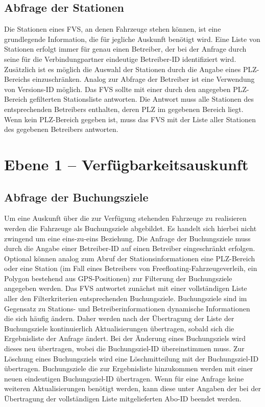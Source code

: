 \subsection{Abfrage der Stationen}
Die Stationen eines FVS, an denen Fahrzeuge stehen können, ist eine grundlegende Information, die für jegliche Auskunft benötigt wird. Eine Liste von Stationen erfolgt immer für genau einen Betreiber, der bei der Anfrage durch seine für die Verbindungpartner eindeutige Betreiber-ID identifiziert wird. Zusätzlich ist es möglich die Auswahl der Stationen durch die Angabe eines PLZ-Bereichs einzuschränken. Analog zur Abfrage der Betreiber ist eine Verwendung von Versions-ID möglich. Das FVS  sollte mit einer durch den angegeben PLZ-Bereich gefilterten Stationsliste antworten. Die Antwort muss alle Stationen des entsprechenden Betreibers enthalten, deren PLZ im gegebenen Bereich liegt. Wenn kein PLZ-Bereich gegeben ist, muss das FVS mit der Liste aller Stationen des gegebenen Betreibers antworten.

\section{Ebene 1 -- Verfügbarkeitsauskunft}

\subsection{Abfrage der Buchungsziele}
 Um eine Auskunft über die zur Verfügung stehenden Fahrzeuge zu realisieren werden die Fahrzeuge als Buchungsziele abgebildet. Es handelt sich hierbei nicht zwingend um eine eins-zu-eins Beziehung. Die Anfrage der Buchungsziele muss durch die Angabe einer Betreiber-ID auf einen Betreiber eingeschränkt erfolgen. Optional können analog zum Abruf der Stationsinformationen eine PLZ-Bereich oder eine Station (im Fall eines Betreibers von Freefloating-Fahrzeugeverleih, ein Polygon bestehend aus GPS-Positionen) zur Filterung der Buchungsziele angegeben werden. Das FVS antwortet zunächst mit einer vollständigen Liste aller den Filterkriterien entsprechenden Buchungsziele. Buchungsziele sind im Gegensatz zu Stations- und Betreiberinformationen dynamische Informationen die sich häufig ändern. Daher werden nach der Übertragung der Liste der Buchungsziele kontinuierlich Aktualisierungen übertragen, sobald sich die Ergebnisliste der Anfrage ändert. Bei der Änderung eines Buchungsziels wird dieses neu übertragen, wobei die Buchungsziel-ID übereinstimmen muss. Zur Löschung eines Buchungsziels wird eine Löschmitteilung mit der Buchungsziel-ID übertragen. Buchungsziele die zur Ergebnisliste hinzukommen werden mit einer neuen eindeutigen Buchungsziel-ID übertragen. Wenn für eine Anfrage keine weiteren Aktualisierungen benötigt werden, kann diese unter Angaben der bei der Übertragung der vollständigen Liste mitgelieferten Abo-ID beendet werden.
 
